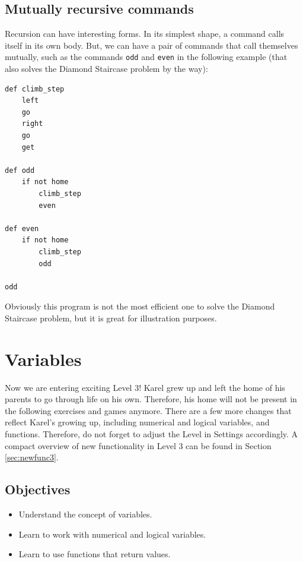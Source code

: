 \subsection{Mutually recursive commands}

Recursion can have interesting forms. In its simplest shape, a command 
calls itself in its own body. But, we can have a pair of commands
that call themselves mutually, such as the commands {\tt odd} and 
{\tt even} in the following example (that also solves the Diamond Staircase
problem by the way):
 
\begin{verbatim}
def climb_step
    left
    go
    right
    go
    get 

def odd
    if not home
        climb_step
        even
    
def even
    if not home
        climb_step
        odd
    
odd
\end{verbatim}
Obviously this program is not the most efficient one to solve the 
Diamond Staircase problem, but it is great for illustration purposes.


\section{Variables} \label{sec:var}

Now we are entering exciting Level 3! Karel grew up and left the home of his 
parents to go through life on his own. Therefore, his home will not be present
in the following exercises and games anymore. There are a few more changes
that reflect Karel's growing up, including numerical and logical variables,
and functions. Therefore, do not forget to adjust the 
Level in Settings accordingly. A compact overview of new functionality in Level 3
can be found in Section \ref{sec:newfunc3}.

\subsection{Objectives} 
 
\begin{itemize}
\item Understand the concept of variables.
\item Learn to work with numerical and logical variables.
\item Learn to use functions that return values. 
\end{itemize}

